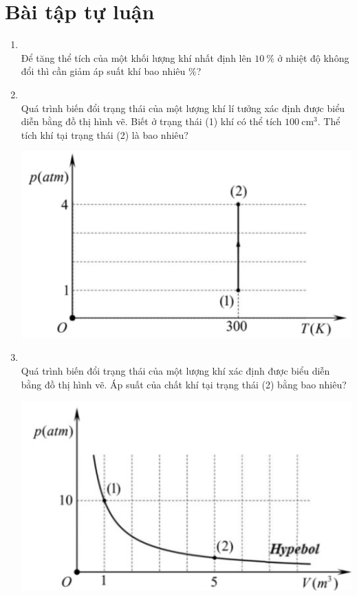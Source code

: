 \section{Bài tập tự luận}
\begin{enumerate}[label=\bfseries Câu \arabic*:, leftmargin=1.7cm]
	
	\item{}\\
	Để tăng thể tích của một khối lượng khí nhất định lên $\SI{10}{\percent}$ ở nhiệt độ không đổi thì cần giảm áp suất khí bao nhiêu $\si{\percent}$?

\item {}\\
Quá trình biến đổi trạng thái của một lượng khí lí tưởng xác định được biểu diễn bằng đồ thị hình vẽ. Biết ở trạng thái (1) khí có thể tích $\SI{100}{\centi\meter^3}$. Thể tích khí tại trạng thái (2) là bao nhiêu?
\begin{center}
	\includegraphics[width=0.45\linewidth]{../figs/VN12-Y24-PH-SYL-010P-1}
\end{center}

\item{}\\
Quá trình biến đổi trạng thái của một lượng khí xác định được biểu diễn bằng đồ thị hình vẽ. Áp suất của chất khí tại trạng thái (2) bằng bao nhiêu?
\begin{center}
	\includegraphics[width=0.45\linewidth]{../figs/VN12-Y24-PH-SYL-010P-2}
\end{center}


\end{enumerate}
